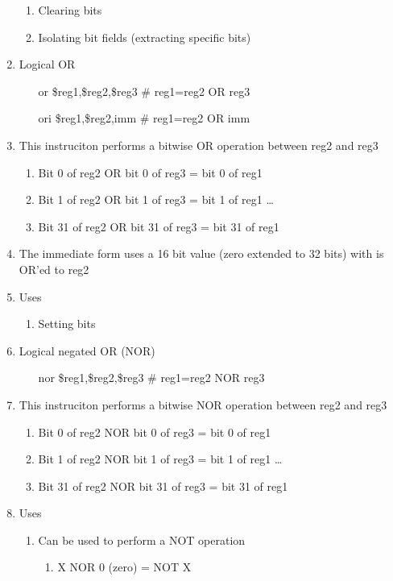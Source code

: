 \documentclass[12pt]{article}
\begin{document}
\begin{enumerate}
  \begin{enumerate}
    \item Clearing bits
    \item Isolating bit fields (extracting specific bits)
  \end{enumerate}
  \item Logical OR
  \begin{enumerate}
    \item[or] \$reg1,\$reg2,\$reg3 \# reg1=reg2 OR reg3
    \item[ori] \$reg1,\$reg2,imm \# reg1=reg2 OR imm
  \end{enumerate}
  \item This instruciton performs a bitwise OR operation between reg2 and reg3
  \begin{enumerate}
    \item Bit 0 of reg2 OR bit 0 of reg3 = bit 0 of reg1
    \item Bit 1 of reg2 OR bit 1 of reg3 = bit 1 of reg1 \dots
    \item Bit 31 of reg2 OR bit 31 of reg3 = bit 31 of reg1
  \end{enumerate}
  \item The immediate form uses a 16 bit value (zero extended to 32 bits) with is OR'ed to reg2
  \item Uses
  \begin{enumerate}
    \item Setting bits
  \end{enumerate}
  \item Logical negated OR (NOR)
  \begin{enumerate}
    \item[nor] \$reg1,\$reg2,\$reg3 \# reg1=reg2 NOR reg3
  \end{enumerate}
  \item This instruciton performs a bitwise NOR operation between reg2 and reg3
  \begin{enumerate}
    \item Bit 0 of reg2 NOR bit 0 of reg3 = bit 0 of reg1
    \item Bit 1 of reg2 NOR bit 1 of reg3 = bit 1 of reg1 \dots
    \item Bit 31 of reg2 NOR bit 31 of reg3 = bit 31 of reg1
  \end{enumerate}
  \item Uses
  \begin{enumerate}
    \item Can be used to perform a NOT operation
    \begin{enumerate}
      \item X NOR 0 (zero) = NOT X
    \end{enumerate}
  \end{enumerate}
\end{enumerate}
\end{document}
